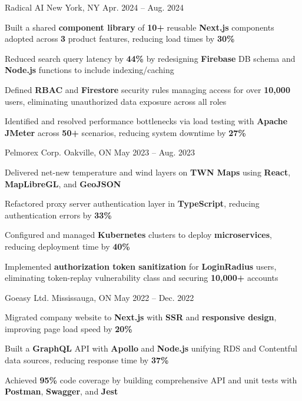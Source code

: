 \documentclass[11pt, a4paper]{awesome-cv}
\begin{document}
\begin{cventries}
  \cventry
    {\color{lightblue}{SOFTWARE ENGINEER INTERN}}
    {Radical AI}
    {New York, NY}
    {Apr. 2024 -- Aug. 2024}
    {
      \begin{cvitems}
        \item{Built a shared \textbf{component library} of \textbf{10+} reusable \textbf{Next.js} components adopted across \textbf{3} product features, reducing load times by \textbf{30\%}}
        \item{Reduced search query latency by \textbf{44\%} by redesigning \textbf{Firebase} DB schema and \textbf{Node.js} functions to include indexing/caching}
        \item{Defined \textbf{RBAC} and \textbf{Firestore} security rules managing access for over \textbf{10,000} users, eliminating unauthorized data exposure across all roles}
        \item{Identified and resolved performance bottlenecks via load testing with \textbf{Apache JMeter} across \textbf{50+} scenarios, reducing system downtime by \textbf{27\%}}
      \end{cvitems}
    }

  \cventry
    {\color{lightblue}{SOFTWARE ENGINEER INTERN}}
    {Pelmorex Corp.}
    {Oakville, ON}
    {May 2023 -- Aug. 2023}
    {
      \begin{cvitems}
        \item{Delivered net-new temperature and wind layers on \textbf{TWN Maps} using \textbf{React}, \textbf{MapLibreGL}, and \textbf{GeoJSON}}
        \item{Refactored proxy server authentication layer in \textbf{TypeScript}, reducing authentication errors by \textbf{33\%}}
        \item{Configured and managed \textbf{Kubernetes} clusters to deploy \textbf{microservices}, reducing deployment time by \textbf{40\%}}
        \item{Implemented \textbf{authorization token sanitization} for \textbf{LoginRadius} users, eliminating token-replay vulnerability class and securing \textbf{10,000+} accounts}
      \end{cvitems}
    }

  \cventry
    {\color{lightblue}{FRONT-END DEVELOPER INTERN}}
    {Goeasy Ltd.}
    {Mississauga, ON}
    {May 2022 -- Dec. 2022}
    {
      \begin{cvitems}
        \item{Migrated company website to \textbf{Next.js} with \textbf{SSR} and \textbf{responsive design}, improving page load speed by \textbf{20\%}}
        \item{Built a \textbf{GraphQL} API with \textbf{Apollo} and \textbf{Node.js} unifying RDS and Contentful data sources, reducing response time by \textbf{37\%}}
        \item{Achieved \textbf{95\%} code coverage by building comprehensive API and unit tests with \textbf{Postman}, \textbf{Swagger}, and \textbf{Jest}}
      \end{cvitems}
    }

\end{cventries}
\end{document}
